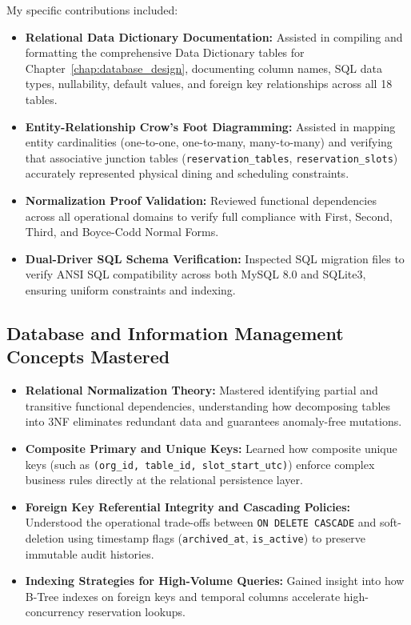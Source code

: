 My specific contributions included:
\begin{itemize}
    \item \textbf{Relational Data Dictionary Documentation:} Assisted in compiling and formatting the comprehensive Data Dictionary tables for Chapter~\ref{chap:database_design}, documenting column names, SQL data types, nullability, default values, and foreign key relationships across all 18 tables.
    \item \textbf{Entity-Relationship Crow's Foot Diagramming:} Assisted in mapping entity cardinalities (one-to-one, one-to-many, many-to-many) and verifying that associative junction tables (\texttt{reservation\_tables}, \texttt{reservation\_slots}) accurately represented physical dining and scheduling constraints.
    \item \textbf{Normalization Proof Validation:} Reviewed functional dependencies across all operational domains to verify full compliance with First, Second, Third, and Boyce-Codd Normal Forms.
    \item \textbf{Dual-Driver SQL Schema Verification:} Inspected SQL migration files to verify ANSI SQL compatibility across both MySQL 8.0 and SQLite3, ensuring uniform constraints and indexing.
\end{itemize}

\subsection{Database and Information Management Concepts Mastered}
\begin{itemize}
    \item \textbf{Relational Normalization Theory:} Mastered identifying partial and transitive functional dependencies, understanding how decomposing tables into 3NF eliminates redundant data and guarantees anomaly-free mutations.
    \item \textbf{Composite Primary and Unique Keys:} Learned how composite unique keys (such as \texttt{(org\_id, table\_id, slot\_start\_utc)}) enforce complex business rules directly at the relational persistence layer.
    \item \textbf{Foreign Key Referential Integrity and Cascading Policies:} Understood the operational trade-offs between \texttt{ON DELETE CASCADE} and soft-deletion using timestamp flags (\texttt{archived\_at}, \texttt{is\_active}) to preserve immutable audit histories.
    \item \textbf{Indexing Strategies for High-Volume Queries:} Gained insight into how B-Tree indexes on foreign keys and temporal columns accelerate high-concurrency reservation lookups.
\end{itemize}

